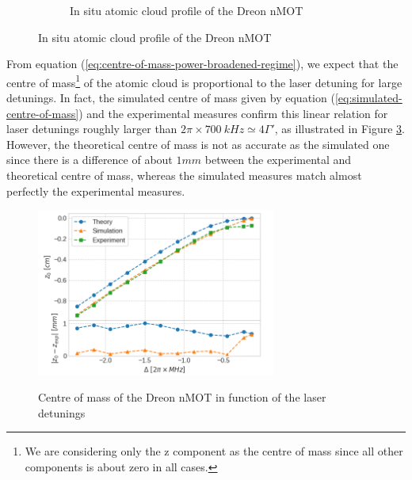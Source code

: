 \begin{figure}[!ht]
\begin{subfigure}[b]{0.3\linewidth}
        \vspace{18px}
        \caption{In situ atomic cloud profile of the Dreon nMOT}
        \label{fig:Dreon-in-situ-atomic-cloud-profile}
    \end{subfigure}
\end{figure}

From equation (\ref{eq:centre-of-mass-power-broadened-regime}), we expect that the centre of mass\footnote{We are considering only the z component as the centre of mass since all other components is about zero in all cases.} of the atomic cloud is proportional to the laser detuning for large detunings. In fact, the simulated centre of mass given by equation (\ref{eq:simulated-centre-of-mass}) and the experimental measures confirm this linear relation for laser detunings roughly larger than $ 2\pi \times 700\ kHz \simeq 4\Gamma' $, as illustrated in Figure \ref{fig:Dreon-centre-of-mass}. However, the theoretical centre of mass is not as accurate as the simulated one since there is a difference of about $1mm$ between the experimental and theoretical centre of mass, whereas the simulated measures match almost perfectly the experimental measures.

\begin{figure}[!ht]
    \centering
    \caption{Centre of mass of the Dreon nMOT in function of the laser detunings}
    \includegraphics[width=0.7\textwidth]{USPSC-img/dy_centre_of_mass.png}
    \vspace{5px}
    \label{fig:Dreon-centre-of-mass}
\end{figure}


